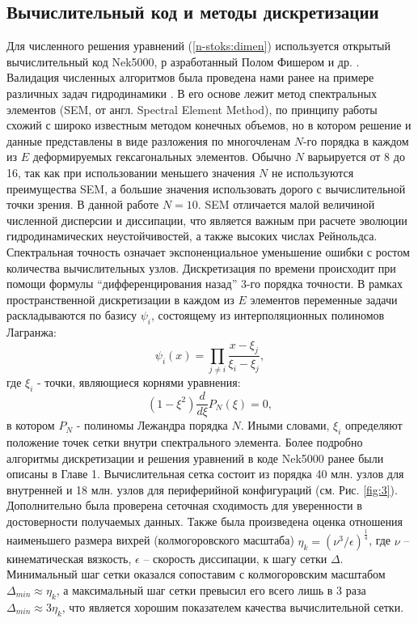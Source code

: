 \subsection{Вычислительный код и методы дискретизации}
%
Для численного решения уравнений (\ref{n-stoks:dimen}) используется открытый вычислительный код Nek5000, р
азработанный Полом Фишером и др. \cite{nek}.
%
Валидация численных алгоритмов была проведена нами ранее на примере различных задач гидродинамики 
\cite{zaripov2021mechanism,zaripov2021reverse,ivashchenko2021effect}.
%
В его основе лежит метод спектральных элементов (SEM, от англ. Spectral Element Method), 
по принципу работы схожий с широко известным методом конечных объемов, 
но в котором решение и данные представлены в виде разложения по многочленам $N$-го порядка
в каждом из $E$ деформируемых гексагональных элементов.
%
Обычно $N$ варьируется от 8 до 16, так как при использовании меньшего значения $N$ 
не используются преимущества SEM, а большие значения использовать дорого с вычислительной точки зрения. 
%
В данной работе  $N=10$.
%
SEM отличается малой величиной численной дисперсии и диссипации, 
что является важным при расчете эволюции гидродинамических неустойчивостей, а также высоких числах Рейнольдса.
%
Спектральная точность означает экспоненциальное уменьшение ошибки с ростом количества вычислительных узлов.
%
Дискретизация по времени происходит при помощи формулы ``дифференцирования назад'' 3-го порядка точности.
%
В рамках пространственной дискретизации в каждом из $E$ элементов переменные 
задачи раскладываются по базису ${\psi_i}$, состоящему из интерполяционных полиномов Лагранжа:
%
\[
\psi_i(x)=\prod_{j \neq i}\frac{x-\xi_j}{\xi_i-\xi_j}, 
\]
%
где $\xi_i$ - точки, являющиеся корнями уравнения:
\[
(1-\xi^2)\frac{d}{d\xi}P_N(\xi)=0,
\]
в котором $P_N$ - полиномы Лежандра порядка $N$. 
%
Иными словами, $\xi_i$ определяют положение точек сетки внутри спектрального элемента.
%
Более подробно алгоритмы дискретизации и решения уравнений в коде Nek5000 ранее были описаны в Главе 1.
%
Вычислительная сетка состоит из порядка 40 млн. узлов для внутренней 
и 18 млн. узлов для периферийной конфигураций (см. Рис. \ref{fig:3}).
%
Дополнительно была проверена сеточная сходимость для уверенности в достоверности получаемых данных.
%
Также была произведена оценка отношения наименьшего размера вихрей (колмогоровского масштаба)  
$\eta_k = (\nu^3/\epsilon)^\frac{1}{4}$, где $\nu$ -- кинематическая вязкость, 
$\epsilon$ -- скорость диссипации, к шагу сетки $\Delta$.
%
Минимальный шаг сетки оказался сопоставим с колмогоровским масштабом 
$\Delta_{min} \approx \eta_k$, а максимальный шаг сетки превысил его всего лишь в 3 раза 
$\Delta_{min} \approx 3\eta_k$, что является хорошим показателем качества вычислительной сетки.

